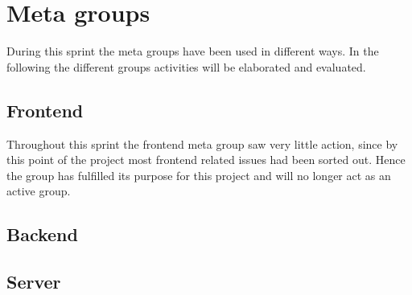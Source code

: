 \section{Meta groups}
During this sprint the meta groups have been used in different ways. 
In the following the different groups activities will be elaborated and evaluated.

\subsection{Frontend}
Throughout this sprint the frontend meta group saw very little action, since by this point of the project most frontend related issues had been sorted out. 
Hence the group has fulfilled its purpose for this project and will no longer act as an active group.

\subsection{Backend}


\subsection{Server}